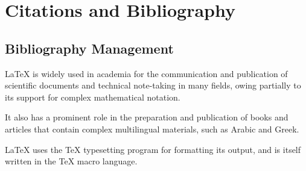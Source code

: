 \chapter{Citations and Bibliography}

\section{Bibliography Management}
LaTeX is widely used in academia for the communication and publication of scientific documents and technical note-taking in many fields, owing partially to its support for complex mathematical notation.\cite{wikipedia}

It also has a prominent role in the preparation and publication of books and articles that contain complex multilingual materials, such as Arabic and Greek.\cite{wikipedia3}

LaTeX uses the TeX typesetting program for formatting its output, and is itself written in the TeX macro language.\cite{wikipedia2}

